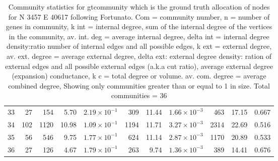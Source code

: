 \begin{table}[ht]
\begin{adjustbox}{max width=\textwidth}
\begin{tabular}{lrrrrrrrrrr}
  33 & 27 & 154 & 5.70 & $2.19 \times 10^{-1}$ & 309 & 11.44 & $1.66 \times 10^{-3}$ & 463 & 17.15 & 0.667 \\ 
  34 & 102 & 1120 & 10.98 & $1.09 \times 10^{-1}$ & 1194 & 11.71 & $3.27 \times 10^{-3}$ & 2314 & 22.69 & 0.516 \\ 
  35 & 56 & 546 & 9.75 & $1.77 \times 10^{-1}$ & 624 & 11.14 & $2.87 \times 10^{-3}$ & 1170 & 20.89 & 0.533 \\ 
  36 & 27 & 126 & 4.67 & $1.79 \times 10^{-1}$ & 263 & 9.74 & $1.36 \times 10^{-3}$ & 389 & 14.41 & 0.676 \\ 
   \hline
\end{tabular}
\end{adjustbox}
\caption[Community statistics for ground truth LFR benchmark]{Community statistics for gtcommunity which is the ground truth allocation of nodes for N 3457 E 40617 following Fortunato. Com = community number, n = number of genes in community,
                  k int = internal degree, sum of the internal degree of the vertices in the community,
                  av. int. deg = average internal degree, 
                  delta int = internal degree density:ratio number of internal edges and all possible edges,
                  k ext = external degree, av. ext. degree = average external degree,
                  delta ext: external degree density: ration of external edges and all possible external edges (a.k.a cut ratio),
                  average external degree (expansion) conductance, k c = total degree or volume. av. com. degree = average combined degree, Showing only communities greater than or equal to 1 in size. Total communities = 36} 
\label{tab:Community statistics for gtcommunity following Fortunato.}
\end{table}
